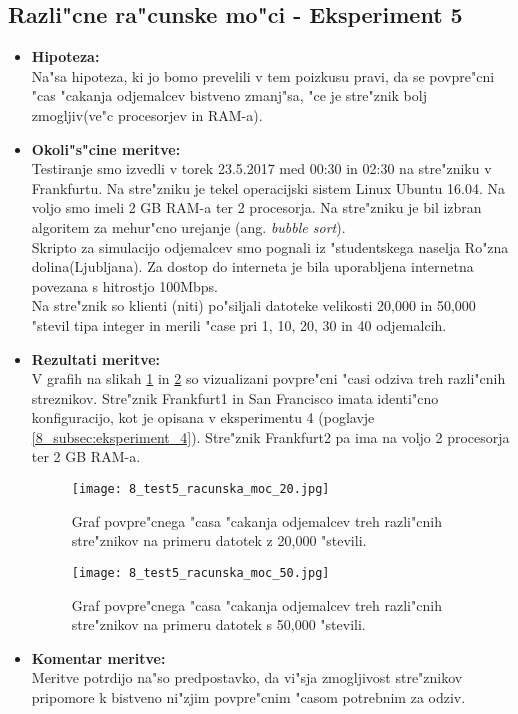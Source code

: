 \subsection{Razli"cne ra"cunske mo"ci - Eksperiment 5}
\begin{itemize}
	\item \textbf{Hipoteza: }  \\
		Na"sa hipoteza, ki jo bomo prevelili v tem poizkusu pravi, da se povpre"cni "cas "cakanja odjemalcev bistveno zmanj"sa, "ce je stre"znik bolj zmogljiv(ve"c procesorjev in RAM-a).

	\item \textbf{Okoli"s"cine meritve: } \\
		Testiranje smo izvedli v torek 23.5.2017 med 00:30 in 02:30 na stre"zniku v Frankfurtu. Na stre"zniku je tekel operacijski sistem Linux Ubuntu 16.04. Na voljo smo imeli 2 GB RAM-a ter 2 procesorja. Na stre"zniku je bil izbran algoritem za mehur"cno urejanje (ang. \textit{bubble sort}).\\ Skripto za simulacijo odjemalcev smo pognali iz "studentskega naselja Ro"zna dolina(Ljubljana). Za dostop do interneta je bila uporabljena internetna povezana s hitrostjo 100Mbps.\\ Na stre"znik so klienti (niti) po"siljali datoteke velikosti 20,000 in 50,000 "stevil tipa integer in merili "case pri 1, 10, 20, 30 in 40 odjemalcih.

 	\item \textbf{Rezultati meritve: }  \\

		V grafih na slikah \ref{8_graf_racunska_moc_20} in \ref{8_graf_racunska_moc_50} so vizualizani povpre"cni "casi odziva treh razli"cnih streznikov. Stre"znik Frankfurt1 in San Francisco imata identi"cno konfiguracijo, kot je opisana v eksperimentu 4 (poglavje \ref{8_subsec:eksperiment_4}). Stre"znik Frankfurt2 pa ima na voljo 2 procesorja ter 2 GB RAM-a.

		\begin{figure}[h]
  		\centering
  		  \texttt{[image: 8\_test5\_racunska\_moc\_20.jpg]}
  		\caption{Graf povpre"cnega "casa "cakanja odjemalcev treh razli"cnih stre"znikov na primeru datotek z 20,000 "stevili.}
  		\label{8_graf_racunska_moc_20}
		\end{figure}

	\begin{figure}[h]
  		\centering
  		  \texttt{[image: 8\_test5\_racunska\_moc\_50.jpg]}
  		\caption{Graf povpre"cnega "casa "cakanja odjemalcev treh razli"cnih stre"znikov na primeru datotek s 50,000 "stevili.}
  		\label{8_graf_racunska_moc_50}
		\end{figure}
	\item \textbf{Komentar meritve: } \\
		Meritve potrdijo na"so predpostavko, da vi"sja zmogljivost stre"znikov pripomore k bistveno ni"zjim povpre"cnim "casom potrebnim za odziv.
\end{itemize}

